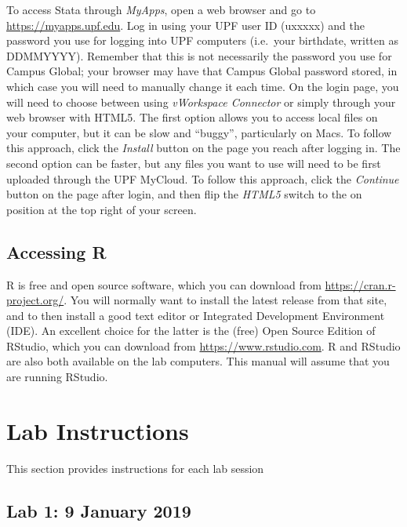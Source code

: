\documentclass[]{book}
\begin{document}
To access Stata through \emph{MyApps}, open a web browser and go to \url{https://myapps.upf.edu}. Log in using your UPF user ID (uxxxxx) and the password you use for logging into UPF computers (i.e.~your birthdate, written as DDMMYYYY). Remember that this is not necessarily the password you use for Campus Global; your browser may have that Campus Global password stored, in which case you will need to manually change it each time. On the login page, you will need to choose between using \emph{vWorkspace Connector} or simply through your web browser with HTML5. The first option allows you to access local files on your computer, but it can be slow and ``buggy'', particularly on Macs. To follow this approach, click the \emph{Install} button on the page you reach after logging in. The second option can be faster, but any files you want to use will need to be first uploaded through the UPF MyCloud. To follow this approach, click the \emph{Continue} button on the page after login, and then flip the \emph{HTML5} switch to the on position at the top right of your screen.

\hypertarget{accessing-r}{%
\section*{Accessing R}\label{accessing-r}}

R is free and open source software, which you can download from \url{https://cran.r-project.org/}. You will normally want to install the latest release from that site, and to then install a good text editor or Integrated Development Environment (IDE). An excellent choice for the latter is the (free) Open Source Edition of RStudio, which you can download from \url{https://www.rstudio.com}. R and RStudio are also both available on the lab computers. This manual will assume that you are running RStudio.

\hypertarget{lab-instructions}{%
\chapter*{Lab Instructions}\label{lab-instructions}}

This section provides instructions for each lab session

\hypertarget{lab-1-9-january-2019}{%
\section*{Lab 1: 9 January 2019}\label{lab-1-9-january-2019}}
\end{document}
